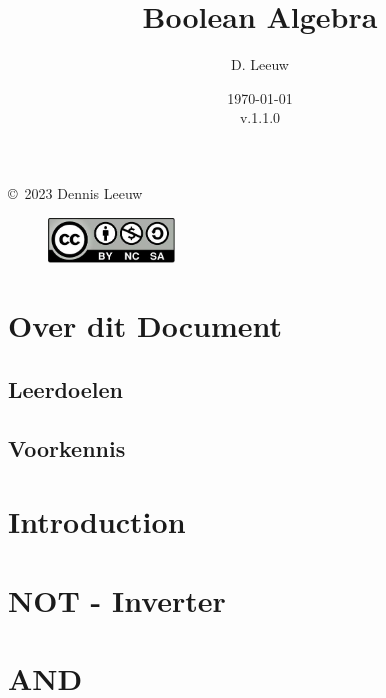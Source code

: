 \documentclass[a4paper,12pt,twoside,openright,titlepage]{book}
\author{D. Leeuw}
\title{Boolean Algebra}
\date{\today\\v.1.1.0}
\begin{document}

\maketitle

\copyright\ 2023 Dennis Leeuw\\

\begin{figure}
\includegraphics[width=0.3\textwidth]{CC-BY-SA-NC.png}
\end{figure}

\bigskip




\frontmatter
\chapter{Over dit Document}
\section{Leerdoelen}

\section{Voorkennis}


\tableofcontents

\mainmatter

\chapter{Introduction}


\chapter{NOT - Inverter}






\chapter{AND}





\end{document}
